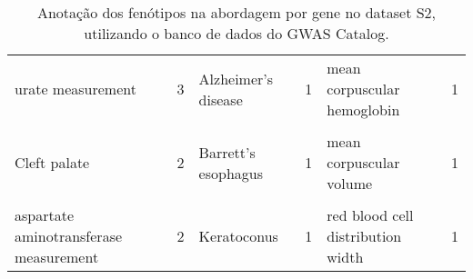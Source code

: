 \begin{landscape}
\begin{table}[p]
{\begin{tabular}[t]{lrlrlr}
urate measurement & 3 & Alzheimer's disease & 1 & mean corpuscular hemoglobin & 1\\
\cellcolor{gray!6}{C-reactive protein measurement} & \cellcolor{gray!6}{2} & \cellcolor{gray!6}{BMI-adjusted waist circumference} & \cellcolor{gray!6}{1} & \cellcolor{gray!6}{mean corpuscular hemoglobin concentration} & \cellcolor{gray!6}{1}\\
Cleft palate & 2 & Barrett's esophagus & 1 & mean corpuscular volume & 1\\
\cellcolor{gray!6}{alcohol dependence} & \cellcolor{gray!6}{2} & \cellcolor{gray!6}{C-reactive protein measurement} & \cellcolor{gray!6}{1} & \cellcolor{gray!6}{monocyte count} & \cellcolor{gray!6}{1}\\
aspartate aminotransferase measurement & 2 & Keratoconus & 1 & red blood cell distribution width & 1\\
\bottomrule
\end{tabular}}

\caption{Anotação dos fenótipos na abordagem por gene no dataset S2, utilizando o banco de dados do GWAS Catalog.}
\label{tab:ds2_gwas_pergene}

\end{table}
\end{landscape}